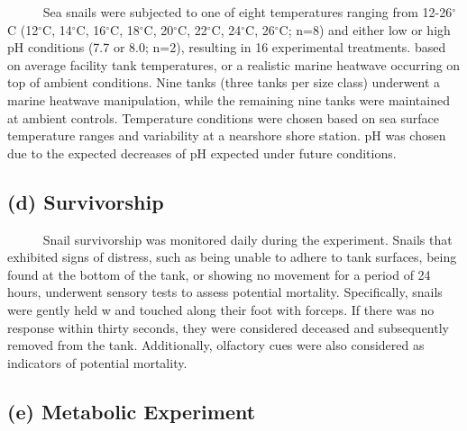 \documentclass[
  12pt,
]{article}
\begin{document}
~~~~~ Sea snails were subjected to one of eight temperatures ranging
from 12-26\(^\circ\)C (12\(^\circ\)C, 14\(^\circ\)C, 16\(^\circ\)C,
18\(^\circ\)C, 20\(^\circ\)C, 22\(^\circ\)C, 24\(^\circ\)C,
26\(^\circ\)C; n=8) and either low or high pH conditions (7.7 or 8.0;
n=2), resulting in 16 experimental treatments. based on average facility
tank temperatures, or a realistic marine heatwave occurring on top of
ambient conditions. Nine tanks (three tanks per size class) underwent a
marine heatwave manipulation, while the remaining nine tanks were
maintained at ambient controls. Temperature conditions were chosen based
on sea surface temperature ranges and variability at a nearshore shore
station. pH was chosen due to the expected decreases of pH expected
under future conditions.

\hypertarget{d-survivorship}{%
\subsection{(d) Survivorship}\label{d-survivorship}}

~~~~~ Snail survivorship was monitored daily during the experiment.
Snails that exhibited signs of distress, such as being unable to adhere
to tank surfaces, being found at the bottom of the tank, or showing no
movement for a period of 24 hours, underwent sensory tests to assess
potential mortality. Specifically, snails were gently held w and touched
along their foot with forceps. If there was no response within thirty
seconds, they were considered deceased and subsequently removed from the
tank. Additionally, olfactory cues were also considered as indicators of
potential mortality.

\hypertarget{e-metabolic-experiment}{%
\subsection{(e) Metabolic Experiment}\label{e-metabolic-experiment}}
\end{document}
